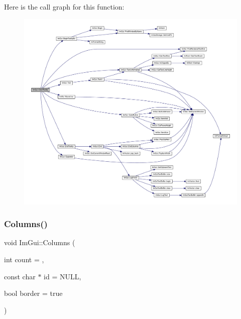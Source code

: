 Here is the call graph for this function\+:
\nopagebreak
\begin{figure}[H]
\begin{center}
\leavevmode
\includegraphics[width=350pt]{namespace_im_gui_afad90b366b6471e3b13175c0ebeb26c8_cgraph}
\end{center}
\end{figure}
\mbox{\label{namespace_im_gui_a0e2889956542527c4039b6b8bf5c2a38}} 
\subsubsection{\texorpdfstring{Columns()}{Columns()}}
{\footnotesize\ttfamily void Im\+Gui\+::\+Columns (\begin{DoxyParamCaption}\item[{int}]{count = {},  }\item[{const char $\ast$}]{id = {\ttfamily NULL},  }\item[{bool}]{border = {\ttfamily true} }\end{DoxyParamCaption})}

